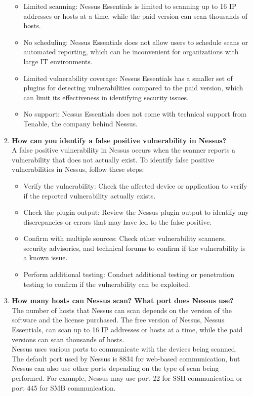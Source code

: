 \documentclass[11pt]{article}
\begin{document}
\begin{enumerate}
          \begin{itemize}
              \item Limited scanning: Nessus Essentials is limited to scanning up to 16 IP addresses or hosts at a time, while the paid version can scan thousands of hosts.
              \item No scheduling: Nessus Essentials does not allow users to schedule scans or automated reporting, which can be inconvenient for organizations with large IT environments.
              \item Limited vulnerability coverage: Nessus Essentials has a smaller set of plugins for detecting vulnerabilities compared to the paid version, which can limit its effectiveness in identifying security issues.
              \item No support: Nessus Essentials does not come with technical support from Tenable, the company behind Nessus.
          \end{itemize}
    \item \textbf{How can you identify a false positive vulnerability in Nessus?}\\

          A false positive vulnerability in Nessus occurs when the scanner reports a vulnerability that does not actually exist. To identify false positive vulnerabilities in Nessus, follow these steps:

          \begin{itemize}
              \item Verify the vulnerability: Check the affected device or application to verify if the reported vulnerability actually exists.
              \item Check the plugin output: Review the Nessus plugin output to identify any discrepancies or errors that may have led to the false positive.
              \item Confirm with multiple sources: Check other vulnerability scanners, security advisories, and technical forums to confirm if the vulnerability is a known issue.
              \item Perform additional testing: Conduct additional testing or penetration testing to confirm if the vulnerability can be exploited.
          \end{itemize}

    \item \textbf{How many hosts can Nessus scan? What port does Nessus use?}\\

          The number of hosts that Nessus can scan depends on the version of the software and the license purchased. The free version of Nessus, Nessus Essentials, can scan up to 16 IP addresses or hosts at a time, while the paid versions can scan thousands of hosts.\\

          Nessus uses various ports to communicate with the devices being scanned. The default port used by Nessus is 8834 for web-based communication, but Nessus can also use other ports depending on the type of scan being performed. For example, Nessus may use port 22 for SSH communication or port 445 for SMB communication.
\end{enumerate}
\end{document}
